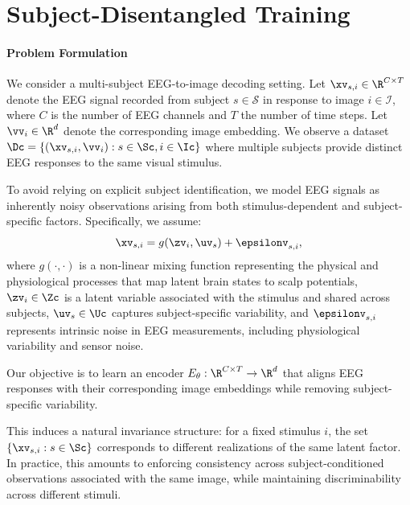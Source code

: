 \documentclass{article}
\begin{document}
\section{Subject-Disentangled Training}
\label{sec:training}
\paragraph{Problem Formulation}
We consider a multi-subject EEG-to-image decoding setting. Let $\xv_{s,i} \in \R^{C\times T}$   denote the EEG signal recorded from subject $s \in \mathcal{S}$ in response to image $i \in \mathcal{I}$,  where $C$ is the number of EEG channels and $T$ the number of time steps.  
Let $\vv_i \in \R^{d}$ denote the corresponding image embedding.   
We observe a dataset $\Dc = \{(\xv_{s,i}, \vv_i): s\in \Sc, i \in \Ic\}$ where multiple subjects provide distinct EEG responses to the same visual stimulus.

To avoid relying on explicit subject identification, we model EEG signals as inherently noisy observations arising from both stimulus-dependent and subject-specific factors. Specifically, we assume:
\begin{equation} \label{eq:genmodel}
  \xv_{s,i} = g(\zv_i, \uv_s) + \epsilonv_{s,i}, %
\end{equation}
 where $g(\cdot, \cdot)$ is a non-linear mixing function representing the physical and physiological processes that map latent brain states to scalp potentials, $\zv_i \in \Zc$ is a latent variable associated with the stimulus and shared across subjects, $\uv_s \in \Uc$ captures subject-specific variability, and $\epsilonv_{s,i}$ represents intrinsic noise in EEG measurements, including physiological variability and sensor noise.

Our objective is to learn an encoder $E_\theta : \R^{C \times T} \to \R^d$ that aligns EEG responses with their corresponding image embeddings while removing subject-specific variability. 

This induces a natural invariance structure: for a fixed stimulus $i$, the set $\{ \xv_{s,i} : s \in \Sc \}$ corresponds to different realizations of the same latent factor. 
In practice, this amounts to enforcing consistency across subject-conditioned observations associated with the same image, while maintaining discriminability across different stimuli.
\end{document}
